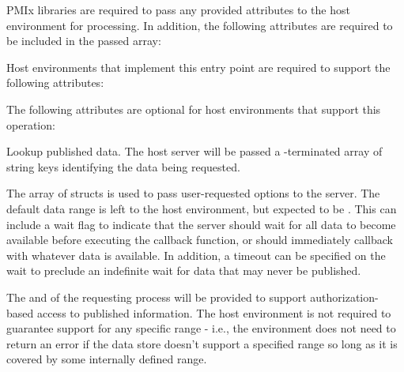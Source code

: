 \reqattrstart
\ac{PMIx} libraries are required to pass any provided attributes to the host environment for processing. In addition, the following attributes are required to be included in the passed  array:


\divider

Host environments that implement this entry point are required to support the following attributes:


\reqattrend

\optattrstart
The following attributes are optional for host environments that support this operation:


\optattrend


\descr

Lookup published data.
The host server will be passed a -terminated array of string keys identifying the data being requested.

The array of  structs is used to pass user-requested options to the server. The default data range is left to the host environment, but expected to be .
This can include a wait flag to indicate that the server should wait for all data to become available before executing the callback function, or should immediately callback with whatever data is available.
In addition, a timeout can be specified on the wait to preclude an indefinite wait for data that may never be published.

\advicermstart
The  and  of the requesting process will be provided to support authorization-based access to published information. The host environment is not required to guarantee support for any specific range - i.e., the environment does not need to return an error if the data store doesn't support a specified range so long as it is covered by some internally defined range.
\advicermend

\subsection{}

\summary

